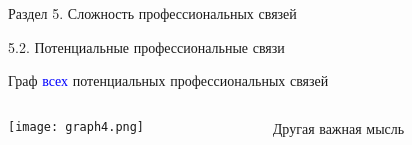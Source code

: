 \begin{frame}{Раздел 5. Сложность профессиональных связей}

{\large 5.2. Потенциальные профессиональные связи}

\small
Граф \textcolor{blue}{всех} потенциальных профессиональных связей

\begin{columns}[T] %
\begin{column}{0.7\textwidth} %
\centering
          \texttt{[image: graph4.png]}
\end{column}
\begin{column}{0.3\textwidth} %
Другая важная мысль
\end{column}
\end{columns}
\end{frame}


